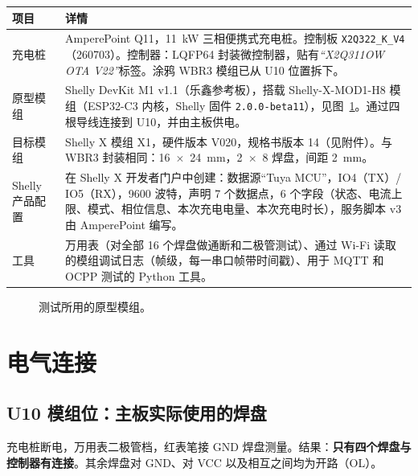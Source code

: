 \documentclass[11pt,a4paper]{article}
\begin{document}
\begin{longtable}{>{\raggedright\arraybackslash}p{3.2cm}>{\raggedright\arraybackslash}p{12.9cm}}
\toprule
\rowcolor{aphead}\textbf{项目} & \textbf{详情} \\
\midrule\endhead
\bottomrule\endfoot
充电桩 & AmperePoint Q11，11~kW 三相便携式充电桩。控制板 \texttt{X2Q322\_K\_V4}（260703）。控制器：LQFP64 封装微控制器，贴有\emph{“X2Q311OW OTA V22”}标签。涂鸦 WBR3 模组已从 U10 位置拆下。 \\
原型模组 & Shelly DevKit M1 v1.1（乐鑫参考板），搭载 Shelly-X-MOD1-H8 模组（ESP32-C3 内核，Shelly 固件 \texttt{2.0.0-beta11}），见图~\ref{fig:devkit}。通过四根导线连接到 U10，并由主板供电。 \\
目标模组 & Shelly X 模组 X1，硬件版本 V020，规格书版本 14（见附件）。与 WBR3 封装相同：16~$\times$~24~mm，2~$\times$~8 焊盘，间距 2~mm。 \\
Shelly 产品配置 & 在 Shelly X 开发者门户中创建：数据源“Tuya MCU”，IO4（TX）/ IO5（RX），9600 波特，声明 7 个数据点，6 个字段（状态、电流上限、模式、相位信息、本次充电电量、本次充电时长），服务脚本 v3 由 AmperePoint 编写。 \\
工具 & 万用表（对全部 16 个焊盘做通断和二极管测试）、通过 Wi-Fi 读取的模组调试日志（帧级，每一串口帧带时间戳）、用于 MQTT 和 OCPP 测试的 Python 工具。 \\
\end{longtable}

\begin{figure}[H]
\centering
{}\hspace{0.6cm}
\caption{测试所用的原型模组。}
\label{fig:devkit}
\end{figure}

\section{电气连接}

\subsection{U10 模组位：主板实际使用的焊盘}

充电桩断电，万用表二极管档，红表笔接 GND 焊盘测量。结果：\textbf{只有四个焊盘与控制器有连接}。其余焊盘对 GND、对 VCC 以及相互之间均为开路（OL）。
\end{document}
